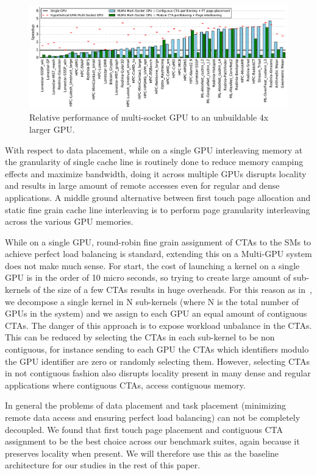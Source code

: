 \begin{figure}[tp]
    \centering
    \includegraphics[width=1.0\linewidth]{figures/plot_different_baselines.pdf}
    \caption{Relative performance of multi-socket GPU to an unbuildable 4x larger GPU.}
    \label{fig:motivation2}
\end{figure}

With respect to data placement, while on a single GPU interleaving memory at 
the granularity of single cache line is routinely done to reduce memory 
camping effects and maximize bandwidth, doing it across multiple GPUs 
disrupts locality and results in large amount of remote accesses even for 
regular and dense applications. A middle ground alternative between first 
touch page allocation and static fine grain cache line interleaving is to 
perform page granularity interleaving across the various GPU memories.

While on a single GPU, round-robin fine grain assignment of CTAs to the SMs 
to achieve perfect load balancing is standard, extending this on a Multi-GPU 
system does not make much sense. For start, the cost of launching a kernel on 
a single GPU is in the order of 10 micro seconds, so trying to create large 
amount of sub-kernels of the size of a few CTAs results in huge overheads. 
For this reason as in~\cite{Cabezas2015}, we decompose a single kernel in N 
sub-kernels (where N is the total number of GPUs in the system) and we assign 
to each GPU an equal amount of contiguous CTAs. The danger of this approach 
is to expose workload unbalance in the CTAs. This can be reduced by selecting 
the CTAs in each sub-kernel to be non contiguous, for instance sending to 
each GPU the CTAs which identifiers modulo the GPU identifier are zero or 
randomly selecting them. However, selecting CTAs in not contiguous fashion
also disrupts locality present in many dense and regular applications where 
contiguous CTAs, access contiguous memory.

In general the problems of data placement and task placement (minimizing 
remote data access and ensuring perfect load balancing) can not be completely 
decoupled. We found that first touch page placement and contiguous CTA 
assignment to be the best choice across our benchmark suites, again because it 
preserves locality when present. We will therefore use this as the baseline 
architecture for our studies in the rest of this paper.

